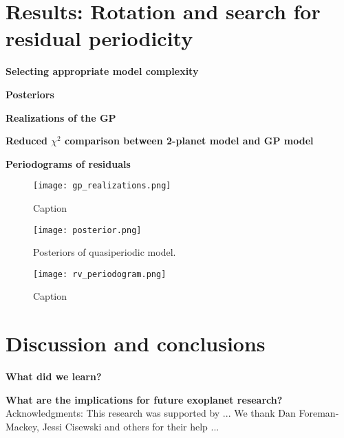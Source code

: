 \documentclass{aastex6}
\begin{document}
\section{Results: Rotation and search for residual periodicity}\label{sec:results}

\textbf{Selecting appropriate model complexity}

\textbf{Posteriors}

\textbf{Realizations of the GP}

\textbf{Reduced $\chi^2$ comparison between 2-planet model and GP model}

\textbf{Periodograms of residuals}\\

\begin{figure} \label{fig:realizations}
    \begin{center}
    \texttt{[image: gp\_realizations.png]}
    \caption{Caption}   
    \end{center}
\end{figure}

\begin{figure} \label{fig:post}
    \begin{center}
    \texttt{[image: posterior.png]}
    \caption{Posteriors of quasiperiodic model.}
     \end{center}
\end{figure}

\begin{figure} \label{fig:periodogram}
    \begin{center}
    \texttt{[image: rv\_periodogram.png]}
    \caption{Caption}
    \end{center}
\end{figure}




\section{Discussion and conclusions}\label{sec:disc}

\textbf{What did we learn?}

\textbf{What are the implications for future exoplanet research?}\\

Acknowledgments: This research was supported by ... We thank
Dan Foreman-Mackey, Jessi Cisewski and others for their help ...

\begin{thebibliography}{99} 



\end{thebibliography}
\end{document}

